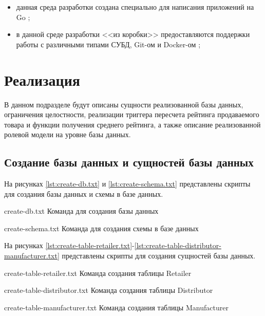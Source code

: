 \begin{itemize}
	\item данная среда разработки создана специально для написания приложений на Go \cite{info_GoLand_doc};
	\item в данной среде разработки <<из коробки>> предоставляются поддержки работы с различными типами СУБД, Git-ом \cite{info_Git} и Docker-ом \cite{info_Docker};
\end{itemize}

\clearpage 

\section{Реализация}

В данном подразделе будут описаны сущности реализованной базы данных, ограничения целостности, реализации триггера пересчета рейтинга продаваемого товара и функции получения среднего рейтинга, а также описание реализованной ролевой модели на уровне базы данных.

\subsection{Создание базы данных и сущностей базы данных}

На рисунках \ref{lst:create-db.txt} и \ref{lst:create-schema.txt} представлены скрипты для создания базы данных и схемы в базе данных.

{create-db.txt} %
{Команда для создания базы данных} %

{create-schema.txt} %
{Команда для создания схемы в базе данных} %

На рисунках \ref{lst:create-table-retailer.txt}-\ref{lst:create-table-distributor-manufacturer.txt} 
представлены скрипты для создания сущностей базы данных.

{create-table-retailer.txt} %
{Команда создания таблицы Retailer} %

{create-table-distributor.txt} %
{Команда создания таблицы Distributor} %

{create-table-manufacturer.txt} %
{Команда создания таблицы Manufacturer} %

